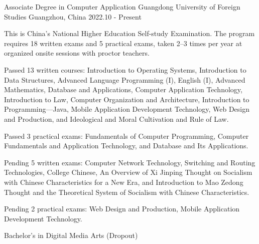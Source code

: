 

\begin{cventries}

  \cventry
    {Associate Degree in Computer Application} %
    {Guangdong University of Foreign Studies} %
    {Guangzhou, China} %
    {2022.10 - Present} %
    {
      \begin{cvitems} %
        \item {This is China's National Higher Education Self-study Examination. The program requires 18 written exams and 5 practical exams, taken 2--3 times per year at organized onsite sessions with proctor teachers.}
        \item {Passed 13 written courses: Introduction to Operating Systems, Introduction to Data Structures, Advanced Language Programming (I), English (I), Advanced Mathematics, Database and Applications, Computer Application Technology, Introduction to Law, Computer Organization and Architecture, Introduction to Programming---Java, Mobile Application Development Technology, Web Design and Production, and Ideological and Moral Cultivation and Rule of Law.}
        \item {Passed 3 practical exams: Fundamentals of Computer Programming, Computer Fundamentals and Application Technology, and Database and Its Applications.}
        \item {Pending 5 written exams: Computer Network Technology, Switching and Routing Technologies, College Chinese, An Overview of Xi Jinping Thought on Socialism with Chinese Characteristics for a New Era, and Introduction to Mao Zedong Thought and the Theoretical System of Socialism with Chinese Characteristics.}
        \item {Pending 2 practical exams: Web Design and Production, Mobile Application Development Technology.}
      \end{cvitems}
    }
  \cventry
    {Bachelor's in Digital Media Arts (Dropout)} %

\end{cventries}

